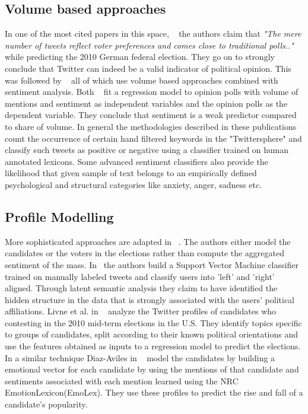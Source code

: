\subsection{Volume based approaches}
In one of the most cited papers in this space, ~\cite{tumasjan2010predicting} the authors claim that 
\emph{ "The mere number of tweets reflect voter preferences and comes close to  traditional polls.."}
while predicting  the 2010 German federal election. %
They go on to strongly conclude that Twitter can indeed be a valid indicator of political opinion.
This was followed by ~\cite{o2010tweets,saez2011total,bermingham2011using,demartini2011analyzing} all of which use volume based approaches combined with sentiment analysis.
Both ~\cite{o2010tweets,bermingham2011using} fit a regression model to opinion polls with volume of mentions and sentiment as independent variables and the opinion polls as the dependent variable. 
They conclude that sentiment is a weak predictor compared to share of volume.
\newline In general the methodologies described in these publications count the occurrence of certain hand filtered keywords in the "Twittersphere" and classify such tweets as positive or negative using a classifier trained on human annotated lexicons.
Some advanced sentiment classifiers also provide the likelihood that given sample of text belongs to an empirically defined psychological and structural categories like anxiety, anger, sadness etc.

\subsection{Profile Modelling}
More sophisticated approaches are adapted in ~\cite{livne2011party,conover2011predicting,diaz2012taking}. 
The authors either model the candidates or the voters in the elections rather than compute the aggregated sentiment of the mass.  
In~\cite{conover2011predicting} the authors build a Support Vector Machine classifier trained on manually labeled tweets and classify users into 'left' and 'right' aligned.
Through latent semantic analysis they claim to have identified the hidden structure in the data that is strongly associated with the users' political affiliations.
Livne et al. in ~\cite{livne2011party} analyze the Twitter profiles of candidates who contesting in the 2010 mid-term elections in the U.S. 
They identify topics specific to groups of candidates, split according to their known political orientations and use the features obtained as inputs to a regression model to predict the elections. 
In a similar technique Diaz-Aviles in ~\cite{diaz2012taking} model the candidates by building a emotional vector for each candidate by using the mentions of that candidate and sentiments associated with each mention learned using the NRC EmotionLexicon(EmoLex). 
They use these profiles to predict the rise and fall of a candidate's popularity. 


